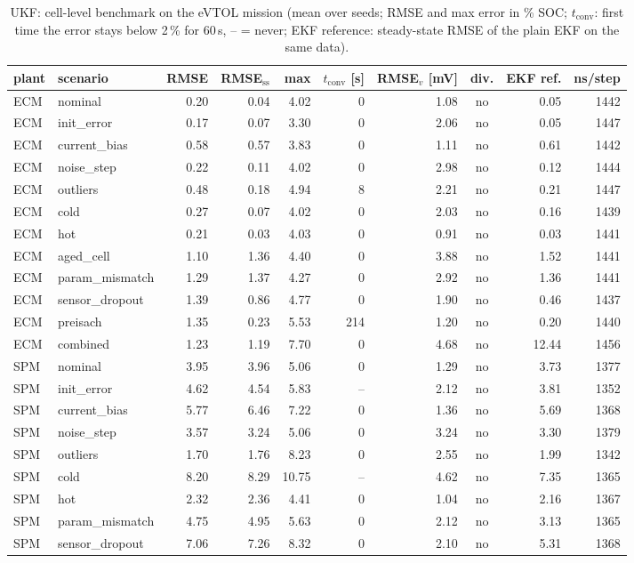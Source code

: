 \begin{table}[H]\centering\footnotesize\setlength{\tabcolsep}{4pt}
\caption{UKF: cell-level benchmark on the eVTOL mission (mean over seeds; RMSE and max error in \% SOC; $t_\mathrm{conv}$: first time the error stays below 2\,\% for 60\,s, -- = never; EKF reference: steady-state RMSE of the plain EKF on the same data).}\label{tab:cell_UKF}
\begin{tabular}{llrrrrrcrr}\toprule
plant & scenario & RMSE & RMSE$_\mathrm{ss}$ & max & $t_\mathrm{conv}$ [s] & RMSE$_v$ [mV] & div. & EKF ref. & ns/step \\ \midrule
ECM & nominal & 0.20 & 0.04 & 4.02 & 0 & 1.08 & no & 0.05 & 1442 \\
ECM & init\_error & 0.17 & 0.07 & 3.30 & 0 & 2.06 & no & 0.05 & 1447 \\
ECM & current\_bias & 0.58 & 0.57 & 3.83 & 0 & 1.11 & no & 0.61 & 1442 \\
ECM & noise\_step & 0.22 & 0.11 & 4.02 & 0 & 2.98 & no & 0.12 & 1444 \\
ECM & outliers & 0.48 & 0.18 & 4.94 & 8 & 2.21 & no & 0.21 & 1447 \\
ECM & cold & 0.27 & 0.07 & 4.02 & 0 & 2.03 & no & 0.16 & 1439 \\
ECM & hot & 0.21 & 0.03 & 4.03 & 0 & 0.91 & no & 0.03 & 1441 \\
ECM & aged\_cell & 1.10 & 1.36 & 4.40 & 0 & 3.88 & no & 1.52 & 1441 \\
ECM & param\_mismatch & 1.29 & 1.37 & 4.27 & 0 & 2.92 & no & 1.36 & 1441 \\
ECM & sensor\_dropout & 1.39 & 0.86 & 4.77 & 0 & 1.90 & no & 0.46 & 1437 \\
ECM & preisach & 1.35 & 0.23 & 5.53 & 214 & 1.20 & no & 0.20 & 1440 \\
ECM & combined & 1.23 & 1.19 & 7.70 & 0 & 4.68 & no & 12.44 & 1456 \\
\midrule
SPM & nominal & 3.95 & 3.96 & 5.06 & 0 & 1.29 & no & 3.73 & 1377 \\
SPM & init\_error & 4.62 & 4.54 & 5.83 & -- & 2.12 & no & 3.81 & 1352 \\
SPM & current\_bias & 5.77 & 6.46 & 7.22 & 0 & 1.36 & no & 5.69 & 1368 \\
SPM & noise\_step & 3.57 & 3.24 & 5.06 & 0 & 3.24 & no & 3.30 & 1379 \\
SPM & outliers & 1.70 & 1.76 & 8.23 & 0 & 2.55 & no & 1.99 & 1342 \\
SPM & cold & 8.20 & 8.29 & 10.75 & -- & 4.62 & no & 7.35 & 1365 \\
SPM & hot & 2.32 & 2.36 & 4.41 & 0 & 1.04 & no & 2.16 & 1367 \\
SPM & param\_mismatch & 4.75 & 4.95 & 5.63 & 0 & 2.12 & no & 3.13 & 1365 \\
SPM & sensor\_dropout & 7.06 & 7.26 & 8.32 & 0 & 2.10 & no & 5.31 & 1368 \\
\bottomrule\end{tabular}\end{table}
